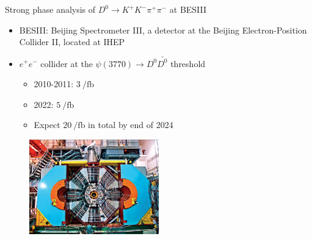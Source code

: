 \documentclass{beamer}
\begin{document}
\begin{frame}{Strong phase analysis of $D^0\to K^+K^-\pi^+\pi^-$ at BESIII}
  \begin{itemize}
    \item{BESIII: Beijing Spectrometer III, a detector at the Beijing Electron-Position Collider II, located at IHEP}
    \item{$e^+e^-$ collider at the $\psi(3770)\to D^0\bar{D^0}$ threshold}
    \begin{itemize}
      \item{2010-2011: $\SI{3}{\per\femto\barn}$}
      \item{2022: $\SI{5}{\per\femto\barn}$}
      \item{Expect $\SI{20}{\per\femto\barn}$ in total by end of 2024}
    \end{itemize}
  \end{itemize}
  \begin{figure}
    \includegraphics[width = 0.50\textwidth]{Plots/BESIIIDetector.jpg}
  \end{figure}
\end{frame}
\end{document}
